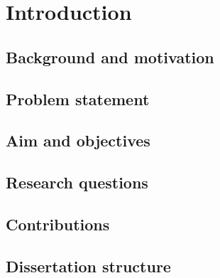 \chapter{Introduction}
\label{chap:introduction}

\section{Background and motivation}

\section{Problem statement}

\section{Aim and objectives}

\section{Research questions}

\section{Contributions}

\section{Dissertation structure}
